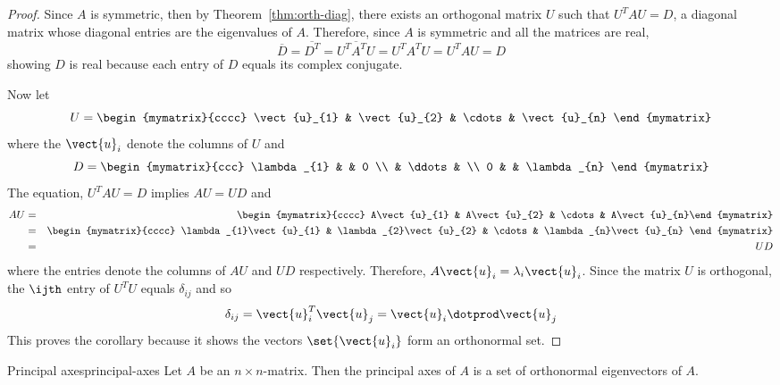 \begin{proof}
Since $A$ is symmetric, then by Theorem~\ref{thm:orth-diag},
there exists an orthogonal matrix $U$ such that $U^{T}AU=D$, a diagonal
matrix whose diagonal entries are the eigenvalues of $A$. Therefore, since $
A $ is symmetric and all the matrices are real, 
\begin{equation*}
\overline{D}=\overline{D^{T}}=\overline{U^{T}A^{T}U}=U^{T}A^{T}U=U^{T}AU=D
\end{equation*}
showing $D$ is real because each entry of $D$ equals its complex conjugate.

Now let 
\begin{equation*}
U=\begin{mymatrix}{cccc}
\vect{u}_{1} & \vect{u}_{2} & \cdots & \vect{u}_{n}
\end{mymatrix}
\end{equation*}
where the $\vect{u}_{i}$ denote the columns of $U$ and 
\begin{equation*}
D=\begin{mymatrix}{ccc}
\lambda _{1} &  & 0 \\ 
& \ddots &  \\ 
0 &  & \lambda _{n}
\end{mymatrix}
\end{equation*}
The equation, $U^{T}AU=D$ implies $AU = UD$ and 
\begin{eqnarray*}
AU &=&\begin{mymatrix}{cccc}
A\vect{u}_{1} & A\vect{u}_{2} & \cdots & A\vect{u}_{n}%
\end{mymatrix} \\
&=&\begin{mymatrix}{cccc}
\lambda _{1}\vect{u}_{1} & \lambda _{2}\vect{u}_{2} & \cdots & \lambda
_{n}\vect{u}_{n}
\end{mymatrix} \\
&=& UD
\end{eqnarray*}
where the entries denote the columns of $AU$ and $UD$ respectively.
Therefore, $A\vect{u}_{i}=\lambda _{i}\vect{u}_{i}$.  Since the matrix $U$
is orthogonal, the $\ijth$ entry of $U^{T}U$ equals $\delta _{ij}$ and so 
\begin{equation*}
\delta _{ij}=\vect{u}_{i}^{T}\vect{u}_{j}=\vect{u}_{i}\dotprod \vect{u}
_{j}
\end{equation*}
This proves the corollary because it shows the vectors $\set{\vect{u}
_{i}} $ form an orthonormal set.
\end{proof}

\begin{definition}{Principal axes}{principal-axes}
Let $A$ be an $n \times n$-matrix. Then the principal axes of $A$ is a set of orthonormal eigenvectors of $A$.
\end{definition}

